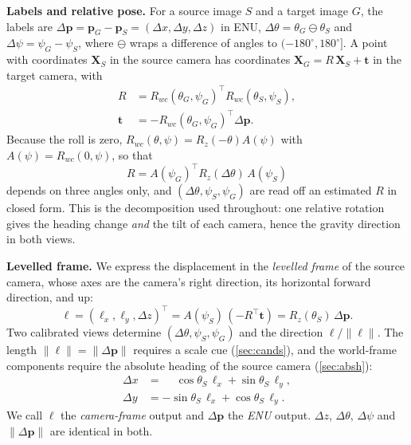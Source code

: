 \documentclass[10pt,twocolumn,letterpaper]{article}
\newcommand{\dth}{\Delta\theta}
\newcommand{\dpsi}{\Delta\psi}
\newcommand{\dpv}{\Delta\mathbf{p}}
\newcommand{\lv}{\bm{\ell}}
\newcommand{\wrapd}{\ominus}
\begin{document}
\noindent\textbf{Labels and relative pose.} For a source image $S$ and a target image $G$, the labels are $\dpv=\mathbf{p}_G-\mathbf{p}_S=(\Delta x,\Delta y,\Delta z)$ in ENU, $\dth=\theta_G\wrapd\theta_S$ and $\dpsi=\psi_G-\psi_S$, where $\wrapd$ wraps a difference of angles to $(-180^\circ,180^\circ]$. A point with coordinates $\mathbf{X}_S$ in the source camera has coordinates $\mathbf{X}_G=R\,\mathbf{X}_S+\mathbf{t}$ in the target camera, with
\begin{equation}
\begin{aligned}
R&=R_{wc}(\theta_G,\psi_G)^{\!\top}R_{wc}(\theta_S,\psi_S),\\
\mathbf{t}&=-R_{wc}(\theta_G,\psi_G)^{\!\top}\dpv .
\end{aligned}
\end{equation}
Because the roll is zero, $R_{wc}(\theta,\psi)=R_z(-\theta)A(\psi)$ with $A(\psi)=R_{wc}(0,\psi)$, so that
\begin{equation}
R=A(\psi_G)^{\!\top}R_z(\dth)\,A(\psi_S)
\label{eq:rdecomp}
\end{equation}
depends on three angles only, and $(\dth,\psi_S,\psi_G)$ are read off an estimated $R$ in closed form. This is the decomposition used throughout: one relative rotation gives the heading change \emph{and} the tilt of each camera, hence the gravity direction in both views.

\noindent\textbf{Levelled frame.} We express the displacement in the \emph{levelled frame} of the source camera, whose axes are the camera's right direction, its horizontal forward direction, and up:
\begin{equation}
\lv=(\ell_x,\ell_y,\Delta z)^{\!\top}=A(\psi_S)\,(-R^{\!\top}\mathbf{t})=R_z(\theta_S)\,\dpv .
\label{eq:level}
\end{equation}
Two calibrated views determine $(\dth,\psi_S,\psi_G)$ and the direction $\lv/\|\lv\|$. The length $\|\lv\|=\|\dpv\|$ requires a scale cue (\cref{sec:cands}), and the world-frame components require the absolute heading of the source camera (\cref{sec:absh}):
\begin{equation}
\begin{aligned}
\Delta x&=\phantom{-}\cos\theta_S\,\ell_x+\sin\theta_S\,\ell_y,\\
\Delta y&=-\sin\theta_S\,\ell_x+\cos\theta_S\,\ell_y .
\end{aligned}
\label{eq:world}
\end{equation}
We call $\lv$ the \emph{camera-frame} output and $\dpv$ the \emph{ENU} output. $\Delta z$, $\dth$, $\dpsi$ and $\|\dpv\|$ are identical in both.
\end{document}

